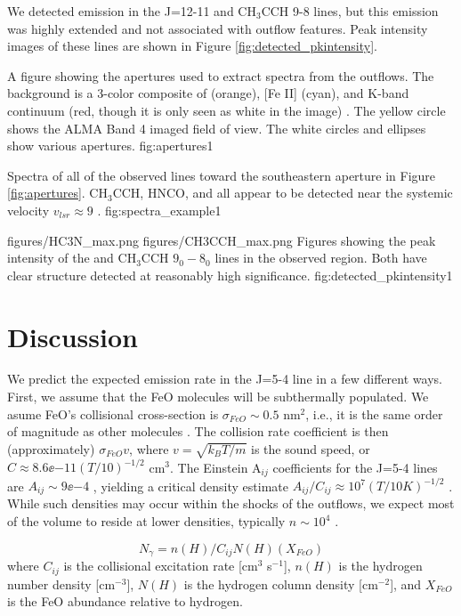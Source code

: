 \documentclass[twocolumn]{aastex61}
\begin{document}
We detected emission in the \cyanoacetylene J=12-11 and CH$_3$CCH 9-8 lines,
but this emission was highly extended and not associated with outflow features.
Peak intensity images of these lines are shown in Figure
\ref{fig:detected_pkintensity}.


{A figure showing the apertures used to extract spectra from the outflows.
The background is a 3-color composite of \hh (orange), [Fe II] (cyan), and
K-band continuum (red, though it is only seen as white in the image)
\citep{Bally2015a,Bally2017a}.
The yellow circle shows the ALMA Band 4 imaged field of view.  The white
circles and ellipses show various apertures.
}{fig:apertures}{1}{\textwidth}

{Spectra of all of the observed lines toward the southeastern aperture in
Figure \ref{fig:apertures}.  CH$_3$CCH, HNCO, and \cyanoacetylene all appear to
be detected near the systemic velocity $v_{lsr}\approx9$ \kms.}
{fig:spectra_example}{1}{\textwidth}

\FigureTwo
{figures/HC3N_max.png}
{figures/CH3CCH_max.png}
{Figures showing the peak intensity of the \cyanoacetylene and CH$_3$CCH $9_0-8_0$ lines
in the observed region.  Both have clear structure detected at reasonably high significance.}
{fig:detected_pkintensity}{1}{\textwidth}

\section{Discussion}
We predict the expected emission rate in the J=5-4 line in a few different ways.
First, we assume that the FeO molecules will be subthermally populated.  We
asume FeO's collisional cross-section is $\sigma_{FeO}\sim0.5$ nm$^2$, i.e., it
is the same order of magnitude as other molecules \citep[the FeO bond length is
$\approx1.63\AA$][]{Tossel1980,Engelking1977}.  The collision rate coefficient
is then (approximately) $\sigma_{FeO} v$, where $v=\sqrt{k_B T / m}$ is the
sound speed, or $C \approx 8.6\ee{-11} (T/10)^{-1/2}$ cm$^3$\pers.  The
Einstein A$_{ij}$ coefficients for the J=5-4 lines are $A_{ij}\sim9\ee{-4}$
\pers, yielding a critical density estimate $A_{ij}/C_{ij} \approx 10^7 (T/10 K)^{-1/2}$
\percc.  While such densities may occur within the shocks of the outflows, we
expect most of the volume to reside at lower densities, typically $n\sim10^4$
\percc.

\begin{equation}
    N_\gamma = n(H) / C_{ij} N(H) (X_{FeO})
\end{equation}
where $C_{ij}$ is the collisional excitation rate [cm$^3$ s$^{-1}$], $n(H)$ is
the hydrogen number density [cm$^{-3}$], $N(H)$ is the hydrogen column density
[cm$^{-2}$], and $X_{FeO}$ is the FeO abundance relative to hydrogen.
\end{document}
